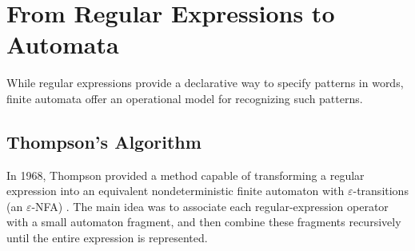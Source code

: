 %

\section{From Regular Expressions to Automata}
While regular expressions provide a declarative way to specify patterns in words, finite automata offer an operational model for recognizing such patterns.



\subsection{Thompson's Algorithm}

In 1968, Thompson provided a method capable of transforming a regular expression into an equivalent nondeterministic finite automaton with $\varepsilon$-transitions (an $\varepsilon$-NFA) \cite{thompson_re2nfa}. The main idea was to associate each regular-expression operator with a small automaton fragment, and then combine these fragments recursively until the entire expression is represented.


